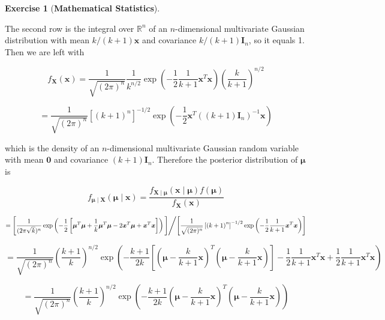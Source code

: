 \documentclass{article}
\theoremstyle{definition}
\newtheorem{exercise}{Exercise}
\theoremstyle{definition}
\theoremstyle{definition}
\theoremstyle{definition}
\theoremstyle{definition}
\begin{document}
\begin{exercise}[\textbf{Mathematical Statistics}]
\begin{enumerate}[(a)]
The second row is the integral over \(\mathbb{R}^n\) of an \(n\)-dimensional multivariate Gaussian distribution with mean \(k/(k+1) \boldsymbol{x}\) and covariance \(k/(k+1) \boldsymbol{I}_n\), so it equals 1. Then we are left with

\[
f_{\boldsymbol{X}}(\boldsymbol{x})  =\frac{1}{\sqrt{(2 \pi )^n}}  \frac{1}{k^{n/2}}\exp \left(- \frac{1}{2} \frac{1}{k+1} \boldsymbol{x}^T \boldsymbol{x}   \right)\left( \frac{k}{k+1} \right)^{n/2}
\]

\begin{equation}\label{2018.screen.3.d.marginal.x.gaussian}
=\frac{1}{\sqrt{(2 \pi )^n}} \left[ \left( k+1 \right)^n \right]^{-1/2} \exp \left(- \frac{1}{2} \boldsymbol{x}^T \left( (k+1) \boldsymbol{I}_n \right)^{-1} \boldsymbol{x}   \right)
\end{equation}

which is the density of an \(n\)-dimensional multivariate Gaussian random variable with mean \(\boldsymbol{0}\) and covariance \((k+1)\boldsymbol{I}_n\). Therefore the posterior distribution of \(\boldsymbol{\mu}\) is

\[
f_{\boldsymbol{\mu} \mid \boldsymbol{X}}(\boldsymbol{\mu} \mid \boldsymbol{x}) = \frac{f_{\boldsymbol{X} \mid \boldsymbol{\mu}}(\boldsymbol{x} \mid \boldsymbol{\mu}) f(\boldsymbol{\mu})}{f_{\boldsymbol{X}}(\boldsymbol{x})}
\]

\[
= \left[   \frac{1}{(2 \pi \sqrt{k})^n  }  \exp \left(- \frac{1}{2}\left[  \boldsymbol{\mu} ^T\boldsymbol{\mu}  + \frac{1}{k}\boldsymbol{\mu} ^T  \boldsymbol{\mu}  - 2 \boldsymbol{x} ^T\boldsymbol{\mu}   + \boldsymbol{x}^T \boldsymbol{x}  \right]  \right)  \Bigg] \middle/  \Bigg[ \frac{1}{\sqrt{(2 \pi )^n}} \left[ \left( k+1 \right)^n \right]^{-1/2} \exp \left(- \frac{1}{2} \frac{1}{k+1} \boldsymbol{x}^T \boldsymbol{x}   \right) \right]
\]

\[
=  \frac{1}{\sqrt{(2\pi)^n}} \left( \frac{k+1}{k} \right)^{n/2} \exp  \left(-  \frac{k+1}{2k} \left[  \left( \boldsymbol{\mu} -  \frac{k}{k+1}  \boldsymbol{x} \right) ^T\left( \boldsymbol{\mu} -  \frac{k}{k+1} \boldsymbol{x} \right) \right] - \frac{1}{2} \frac{1}{k+1}  \boldsymbol{x}^T \boldsymbol{x}  + \frac{1}{2} \frac{1}{k+1} \boldsymbol{x}^T \boldsymbol{x}\right)  
\]

\[
=  \frac{1}{\sqrt{(2\pi)^n}} \left( \frac{k+1}{k} \right)^{n/2} \exp  \left(-  \frac{k+1}{2k}  \left( \boldsymbol{\mu} -  \frac{k}{k+1}  \boldsymbol{x} \right) ^T\left( \boldsymbol{\mu} -  \frac{k}{k+1} \boldsymbol{x} \right)\right)  
\]


\end{enumerate}
\end{exercise}
\end{document}
